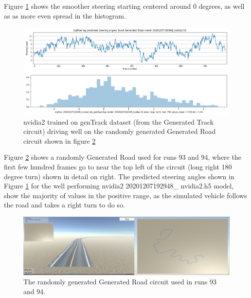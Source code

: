 Figure \ref{fig:20201207192948_nvidia2_dry_genRoad} shows the smoother steering starting centered around 0 degrees, as well as as more even spread in the histogram.
\begin{figure}[ht]
 \centering 
 \includegraphics[width=\textwidth]{Figures/20201207192948_nvidia2_dry_genRoad.png}
 \caption{nvidia2 trained on genTrack dataset (from the Generated Track circuit) driving well on the randomly generated Generated Road circuit shown in figure \ref{fig:run-93-94-generated-road}}
 \label{fig:20201207192948_nvidia2_dry_genRoad} 
\end{figure}

Figure \ref{fig:run-93-94-generated-road} shows a randomly Generated Road used for runs 93 and 94, where the first few hundred frames go to near the top left of the circuit (long right 180 degree turn) shown in detail on right. The predicted steering angles shown in Figure  \ref{fig:20201207192948_nvidia2_dry_genRoad} for the well performing nvidia2 20201207192948\_ nvidia2.h5 model, show the majority of values in the positive range, as the simulated vehicle follows the road and takes a right turn to do so.

\begin{figure}[ht]
 \centering 
 \includegraphics[width=\textwidth]{Figures/run-93-94-generated-road.png}
 \caption{The randomly generated Generated Road circuit used in runs 93 and 94.}
 \label{fig:run-93-94-generated-road} 
\end{figure}


